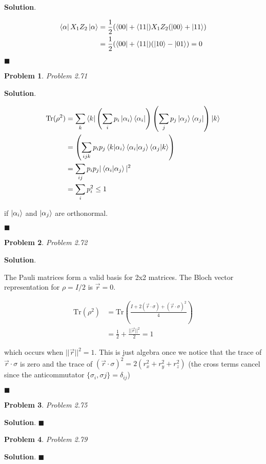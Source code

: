 \documentclass[12pt]{article}
\newtheorem{p}{Problem}
\theoremstyle{definition}
\newenvironment{s}{%
        \begin{trivlist} \item \textbf{Solution}. }{%
            \hspace*{\fill} $\blacksquare$\end{trivlist}}%
\begin{document}
{\begin{s}

\begin{align*}
\bra{\alpha}X_{1}Z_{2}\ket{\alpha} &= \frac{1}{2}(\bra{00}+\bra{11}) X_{1}Z_{2} (\ket{00} + \ket{11})\\
&= \frac{1}{2}(\bra{00}+\bra{11})(\ket{10} - \ket{01}) = 0
\end{align*}

\end{s}

\begin{p}
Problem 2.71
\end{p}

\begin{s}

\begin{align*}
\mathrm{Tr} (\rho^{2}) &= \sum_{k}\bra{k}\left(\sum_{i}p_{i}\ket{\alpha_{i}}\bra{\alpha_{i}}\right)\left(\sum_{j}p_{j}\ket{\alpha_{j}}\bra{\alpha_{j}}\right)\ket{k}\\
&= \left(\sum_{ijk}p_{i}p_{j}\bra{k}\ket{\alpha_{i}}\bra{\alpha_{i}}\ket{\alpha_{j}}\bra{\alpha_{j}}\ket{k}\right)\\
&= \sum_{ij} p_{i}p_{j} |\bra{\alpha_{i}}\ket{\alpha_{j}}|^{2} \\
&= \sum_{i}p_{i}^{2} \leq 1
\end{align*}


if $\ket{\alpha_{i}}$ and $\ket{\alpha_{j}}$ are orthonormal.

\end{s}

\begin{p}
Problem 2.72
\end{p}

\begin{s}

The Pauli matrices form a valid basis for 2x2 matrices. The Bloch vector representation for $\rho = I/2$ is $\vec{r} = 0$. 

\begin{align*}
\mathrm{Tr}(\rho^{2}) &= \mathrm{Tr}\left(\frac{I + 2(\vec{r}\cdot\sigma) + (\vec{r}\cdot\sigma)^{2}}{4}\right)\\
&= \frac{1}{2} + \frac{||\vec{r}||^{2}}{2} = 1
\end{align*}

which occurs when $||\vec{r}||^{2} = 1$. This is just algebra once we notice that the trace of $\vec{r}\cdot\sigma$ is zero and the trace of $(\vec{r}\cdot\sigma)^{2} = 2(r_{x}^{2} + r_{y}^{2} + r_{z}^{2})$ (the cross terms cancel since the anticommutator $\{\sigma_{i},\sigma{j}\} = \delta_{ij}$)

\end{s}

\begin{p}
Problem 2.75
\end{p}

\begin{s}
\end{s}

\begin{p}
Problem 2.79
\end{p}

\begin{s}
\end{s}
\end{document}
